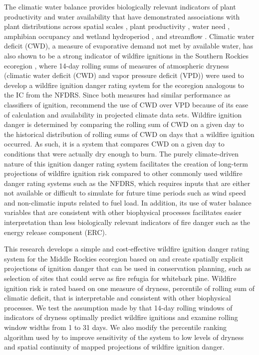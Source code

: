 \documentclass[11p]{article}
\begin{document}
The climatic water balance provides biologically relevant indicators of plant productivity and water availability that have demonstrated associations with plant distributions across spatial scales \citep{stephensonActualEvapotranspirationDeficit1998,stephensonClimaticControlVegetation1990}, plant productivity \citep{thomaSemiaridVegetationResponse2016,thomaWaterBalanceIndicator2020}, water need \citep{thomaLandscapePivotPoints2019}, amphibian occupancy and wetland hydroperiod \citep{rayMultispeciesAmphibianMonitoring2022,lafranceAmphibianRichnessRarity2024}, and streamflow \citep{thomaWaterBalanceIndicator2020}. Climatic water deficit (CWD), a measure of evaporative demand not met by available water, has also shown to be a strong indicator of wildfire ignitions in the Southern Rockies ecoregion \citep{omernikEcoregionsConterminousUnited1987}, where 14-day rolling sums of measures of atmospheric dryness (climatic water deficit (CWD) and vapor pressure deficit (VPD)) were used to develop a wildfire ignition danger rating system for the ecoregion \citep{thomaWaterBalanceIndicator2020} analogous to the IC from the NFDRS. Since both measures had similar performance as classifiers of ignition, \citet{thomaWaterBalanceIndicator2020} recommend the use of CWD over VPD because of its ease of calculation and availability in projected climate data sets. Wildfire ignition danger is determined by comparing the rolling sum of CWD on a given day to the historical distribution of rolling sums of CWD on days that a wildfire ignition occurred. As such, it is a system that compares CWD on a given day to conditions that were actually dry enough to burn. The purely climate-driven nature of this ignition danger rating system facilitates the creation of long-term projections of wildfire ignition risk compared to other commonly used wildfire danger rating systems such as the NFDRS, which requires inputs that are either not available or difficult to simulate for future time periods such as wind speed and non-climatic inputs related to fuel load. In addition, its use of water balance variables that are consistent with other biophysical processes facilitates easier interpretation than less biologically relevant indicators of fire danger such as the energy release component (ERC).

This research develops a simple and cost-effective wildfire ignition danger rating system for the Middle Rockies ecoregion based on \citet{thomaWaterBalanceIndicator2020} and create spatially explicit projections of ignition danger that can be used in conservation planning, such as selection of sites that could serve as fire refugia for whitebark pine. Wildfire ignition risk is rated based on one measure of dryness, percentile of rolling sum of climatic deficit, that is interpretable and consistent with other biophysical processes. We test the assumption made by \citet{thomaWaterBalanceIndicator2020} that 14-day rolling windows of indicators of dryness optimally predict wildfire ignitions and examine rolling window widths from 1 to 31 days. We also modify the percentile ranking algorithm used by \citet{thomaWaterBalanceIndicator2020} to improve sensitivity of the system to low levels of dryness and spatial continuity of mapped projections of wildfire ignition danger. 
\end{document}
